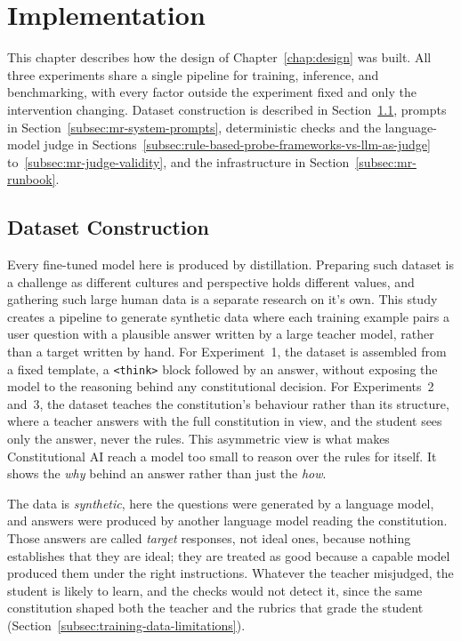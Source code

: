 \chapter{Implementation}
\label{chap:implementation}

This chapter describes how the design of Chapter~\ref{chap:design} was built. All three experiments share a single pipeline for training, inference, and benchmarking, with every factor outside the experiment fixed and only the intervention changing. Dataset construction is described in Section~\ref{subsec:mr-dataset}, prompts in Section~\ref{subsec:mr-system-prompts}, deterministic checks and the language-model judge in Sections~\ref{subsec:rule-based-probe-frameworks-vs-llm-as-judge} to~\ref{subsec:mr-judge-validity}, and the infrastructure in Section~\ref{subsec:mr-runbook}.

\section{Dataset Construction}
\label{subsec:mr-dataset}

Every fine-tuned model here is produced by distillation. Preparing such dataset is a challenge as different cultures and perspective holds different values, and gathering such large human data is a separate research on it's own. This study creates a pipeline to generate synthetic data where each training example pairs a user question with a plausible answer written by a large teacher model, rather than a target written by hand. For Experiment~1, the dataset is assembled from a fixed template, a \texttt{<think>} block followed by an answer, without exposing the model to the reasoning behind any constitutional decision. For Experiments~2 and~3, the dataset teaches the constitution's behaviour rather than its structure, where a teacher answers with the full constitution in view, and the student sees only the answer, never the rules. This asymmetric view is what makes Constitutional AI reach a model too small to reason over the rules for itself. It shows the \emph{why} behind an answer rather than just the \emph{how}.

The data is \emph{synthetic}, here the questions were generated by a language model, and answers were produced by another language model reading the constitution. Those answers are called \emph{target} responses, not ideal ones, because nothing establishes that they are ideal; they are treated as good because a capable model produced them under the right instructions. Whatever the teacher misjudged, the student is likely to learn, and the checks would not detect it, since the same constitution shaped both the teacher and the rubrics that grade the student (Section~\ref{subsec:training-data-limitations}).

